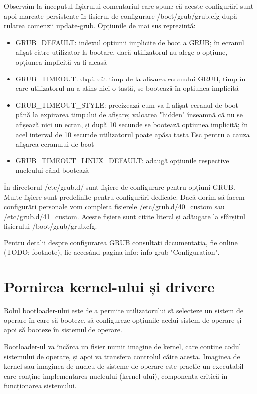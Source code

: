 Observăm la începutul fișierului comentariul care spune că aceste configurări
sunt apoi marcate persistente în fișierul de configurare /boot/grub/grub.cfg
după rularea comenzii update-grub. Opțiunile de mai sus reprezintă:

\begin{itemize}
	\item GRUB_DEFAULT: indexul opțiunii implicite de boot a GRUB; în
		ecranul afișat către utilizator la bootare, dacă utilizatorul nu
		alege o opțiune, opțiunea implicită va fi aleasă
	\item GRUB_TIMEOUT: după cât timp de la afișarea ecranului GRUB, timp în
		care utilizatorul nu a atins nici o tastă, se bootează în
		optiunea implicită
	\item GRUB_TIMEOUT_STYLE: precizează cum va fi afișat ecranul de boot
		până la expirarea timpului de afișare; valoarea "hidden"
		înseamnă că nu se afișează nici un ecran, și după 10 secunde se
		bootează opțiunea implicită; în acel interval de 10 secunde
		utilizatorul poate apăsa tasta Esc pentru a cauza afișarea
		ecranului de boot
	\item GRUB_TIMEOUT_LINUX_DEFAULT: adaugă opțiunile respective nucleului
		când bootează
\end{itemize}

În directorul /etc/grub.d/ sunt fișiere de configurare pentru opțiuni GRUB.
Multe fișiere sunt predefinite pentru configurări dedicate. Dacă dorim să facem
configurări personale vom completa fișierele /etc/grub.d/40_custom sau
/etc/grub.d/41_custom. Aceste fișiere sunt citite literal și adăugate la
sfârșitul fișierului /boot/grub/grub.cfg.

Pentru detalii despre configurarea GRUB consultați documentația, fie online
(TODO: footnote), fie accesând pagina info: info grub "Configuration".

\section{Pornirea kernel-ului și drivere}
\label{sec:boot-bootupos}

Rolul bootloader-ului este de a permite utilizatorului să selecteze un sistem de
operare în care să booteze, să configureze opțiunile acelui sistem de operare și
apoi să booteze în sistemul de operare.

Bootloader-ul va încărca un fișier numit imagine de kernel, care conține codul
sistemului de operare, și apoi va transfera controlul către acesta. Imaginea de
kernel sau imaginea de nucleu de sisteme de operare este practic un executabil
care conține implementarea nucleului (kernel-ului), componenta critică în
funcționarea sistemului.

